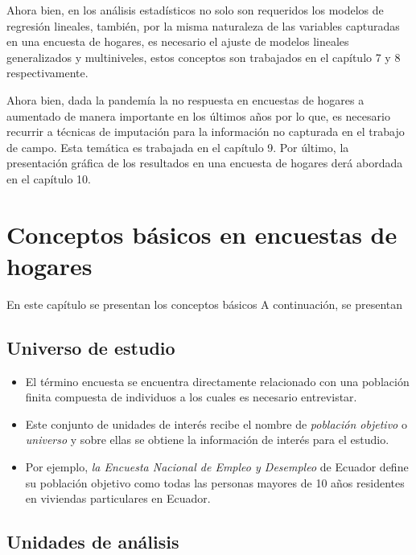 \documentclass[
]{article}
\providecommand{\tightlist}{%
  \setlength{\itemsep}{0pt}\setlength{\parskip}{0pt}}
\begin{document}
Ahora bien, en los análisis estadísticos no solo son requeridos los
modelos de regresión lineales, también, por la misma naturaleza de las
variables capturadas en una encuesta de hogares, es necesario el ajuste
de modelos lineales generalizados y multiniveles, estos conceptos son
trabajados en el capítulo 7 y 8 respectivamente.

Ahora bien, dada la pandemía la no respuesta en encuestas de hogares a
aumentado de manera importante en los últimos años por lo que, es
necesario recurrir a técnicas de imputación para la información no
capturada en el trabajo de campo. Esta temática es trabajada en el
capítulo 9. Por último, la presentación gráfica de los resultados en una
encuesta de hogares derá abordada en el capítulo 10.

\hypertarget{conceptos-buxe1sicos-en-encuestas-de-hogares}{%
\section{Conceptos básicos en encuestas de
hogares}\label{conceptos-buxe1sicos-en-encuestas-de-hogares}}

En este capítulo se presentan los conceptos básicos A continuación, se
presentan

\hypertarget{universo-de-estudio}{%
\subsection{Universo de estudio}\label{universo-de-estudio}}

\begin{itemize}
\tightlist
\item
  El término encuesta se encuentra directamente relacionado con una
  población finita compuesta de individuos a los cuales es necesario
  entrevistar.
\item
  Este conjunto de unidades de interés recibe el nombre de
  \emph{población objetivo} o \emph{universo} y sobre ellas se obtiene
  la información de interés para el estudio.
\item
  Por ejemplo, \emph{la Encuesta Nacional de Empleo y Desempleo} de
  Ecuador define su población objetivo como todas las personas mayores
  de 10 años residentes en viviendas particulares en Ecuador.
\end{itemize}

\hypertarget{unidades-de-anuxe1lisis}{%
\subsection{Unidades de análisis}\label{unidades-de-anuxe1lisis}}
\end{document}
